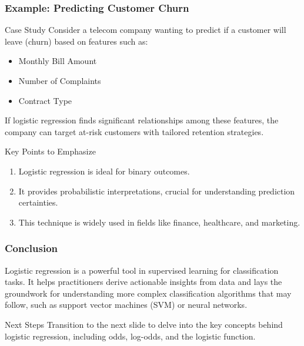 \documentclass[aspectratio=169]{beamer}
\begin{document}
\begin{frame}[fragile]
    \frametitle{Example: Predicting Customer Churn}
    \begin{block}{Case Study}
        Consider a telecom company wanting to predict if a customer will leave (churn) based on features such as:
        \begin{itemize}
            \item Monthly Bill Amount
            \item Number of Complaints
            \item Contract Type
        \end{itemize}
        
        If logistic regression finds significant relationships among these features, the company can target at-risk customers with tailored retention strategies.
    \end{block}

    \begin{block}{Key Points to Emphasize}
        \begin{enumerate}
            \item Logistic regression is ideal for binary outcomes.
            \item It provides probabilistic interpretations, crucial for understanding prediction certainties.
            \item This technique is widely used in fields like finance, healthcare, and marketing.
        \end{enumerate}
    \end{block}
\end{frame}

\begin{frame}[fragile]
    \frametitle{Conclusion}
    Logistic regression is a powerful tool in supervised learning for classification tasks. It helps practitioners derive actionable insights from data and lays the groundwork for understanding more complex classification algorithms that may follow, such as support vector machines (SVM) or neural networks.

    \begin{block}{Next Steps}
        Transition to the next slide to delve into the key concepts behind logistic regression, including odds, log-odds, and the logistic function.
    \end{block}
\end{frame}
\end{document}
